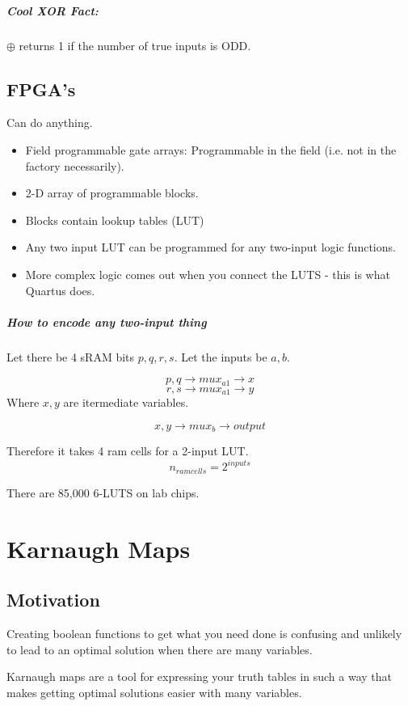 \documentclass[a4paper,12pt]{report}
\begin{document}
\paragraph{Cool XOR Fact: } $\oplus$ returns 1 if the number of true inputs is ODD.

\section{FPGA's}
Can do anything.
\begin{itemize}
\item Field programmable gate arrays: Programmable in the field (i.e. not in the factory necessarily).
\item 2-D array of programmable blocks.
\item Blocks contain lookup tables (LUT)
\item Any two input LUT can be programmed for any two-input logic functions.
\item More complex logic comes out when you connect the LUTS - this is what Quartus does. 
\end{itemize}

\paragraph{How to encode any two-input thing}
Let there be 4 sRAM bits $p, q, r, s$. Let the inputs be $a, b$. 

$${p, q} \to mux_{a1} \to x$$
$${r, s} \to mux_{a1} \to y$$
Where $x, y$ are itermediate variables.

$${x, y} \to mux_{b} \to output$$

Therefore it takes 4 ram cells for a 2-input LUT. $$n_{ramcells} = 2^{inputs}$$

There are 85,000 6-LUTS on lab chips.

\chapter{Karnaugh Maps}
\section{Motivation}
Creating boolean functions to get what you need done is confusing and unlikely to lead to an optimal solution 
when there are many variables.

Karnaugh maps are a tool for expressing your truth tables in such a way that makes getting optimal solutions easier
with many variables.
\end{document}
